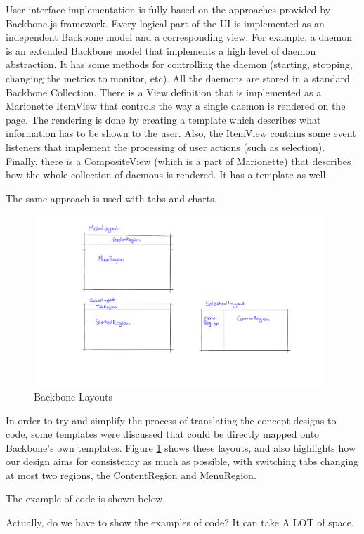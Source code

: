 \documentclass{l3proj}
\begin{document}
User interface implementation is fully based on the approaches provided by Backbone.js framework. Every logical part of the UI is implemented as an independent Backbone model and a corresponding view. For example, a daemon is an extended Backbone model that implements a high level of daemon abstraction. It has some methods for controlling the daemon (starting, stopping, changing the metrics to monitor, etc). All the daemons are stored in a standard Backbone Collection. There is a View definition that is implemented as a Marionette ItemView that controls the way a single daemon is rendered on the page. The rendering is done by creating a template which describes what information has to be shown to the user. Also, the ItemView contains some event listeners that implement the processing of user actions (such as selection). Finally, there is a CompositeView (which is a part of Marionette) that describes how the whole collection of daemons is rendered. It has a template as well.

The same approach is used with tabs and charts.

\begin{figure}[H]
\centering
\includegraphics[width=110mm]{Concept_Designs/BackboneLayouts.png}
\caption{Backbone Layouts}
\label{fig:BackboneLayouts}
\end{figure}

In order to try and simplify the process of translating the concept designs to code, some templates were discussed that could be directly mapped onto Backbone's own templates. Figure \ref{fig:BackboneLayouts} shows these layouts, and also highlights how our design aims for consistency as much as possible, with switching tabs changing at most two regions, the ContentRegion and MenuRegion.

The example of code is shown below.

Actually, do we have to show the examples of code? It can take A LOT of space.
\end{document}
